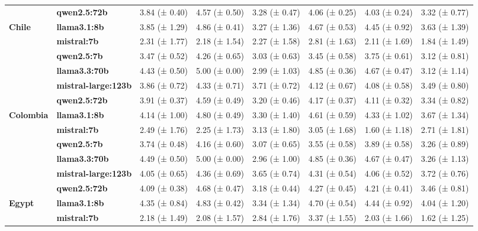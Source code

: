 \begin{longtable}{llllllll}
\textbf{} & \textbf{qwen2.5:72b} & 3.84 (± 0.40) & 4.57 (± 0.50) & 3.28 (± 0.47) & 4.06 (± 0.25) & 4.03 (± 0.24) & 3.32 (± 0.77) \\
\cline{1-8}
\multirow[t]{6}{*}{\textbf{Chile}} & \textbf{llama3.1:8b} & 3.85 (± 1.29) & 4.86 (± 0.41) & 3.27 (± 1.36) & 4.67 (± 0.53) & 4.45 (± 0.92) & 3.63 (± 1.39) \\
\textbf{} & \textbf{mistral:7b} & 2.31 (± 1.77) & 2.18 (± 1.54) & 2.27 (± 1.58) & 2.81 (± 1.63) & 2.11 (± 1.69) & 1.84 (± 1.49) \\
\textbf{} & \textbf{qwen2.5:7b} & 3.47 (± 0.52) & 4.26 (± 0.65) & 3.03 (± 0.63) & 3.45 (± 0.58) & 3.75 (± 0.61) & 3.12 (± 0.81) \\
\textbf{} & \textbf{llama3.3:70b} & 4.43 (± 0.50) & 5.00 (± 0.00) & 2.99 (± 1.03) & 4.85 (± 0.36) & 4.67 (± 0.47) & 3.12 (± 1.14) \\
\textbf{} & \textbf{mistral-large:123b} & 3.86 (± 0.72) & 4.33 (± 0.71) & 3.71 (± 0.72) & 4.12 (± 0.67) & 4.08 (± 0.58) & 3.49 (± 0.80) \\
\textbf{} & \textbf{qwen2.5:72b} & 3.91 (± 0.37) & 4.59 (± 0.49) & 3.20 (± 0.46) & 4.17 (± 0.37) & 4.11 (± 0.32) & 3.34 (± 0.82) \\
\cline{1-8}
\multirow[t]{6}{*}{\textbf{Colombia}} & \textbf{llama3.1:8b} & 4.14 (± 1.00) & 4.80 (± 0.49) & 3.30 (± 1.40) & 4.61 (± 0.59) & 4.33 (± 1.02) & 3.67 (± 1.34) \\
\textbf{} & \textbf{mistral:7b} & 2.49 (± 1.76) & 2.25 (± 1.73) & 3.13 (± 1.80) & 3.05 (± 1.68) & 1.60 (± 1.18) & 2.71 (± 1.81) \\
\textbf{} & \textbf{qwen2.5:7b} & 3.74 (± 0.48) & 4.16 (± 0.60) & 3.07 (± 0.65) & 3.55 (± 0.58) & 3.89 (± 0.58) & 3.26 (± 0.89) \\
\textbf{} & \textbf{llama3.3:70b} & 4.49 (± 0.50) & 5.00 (± 0.00) & 2.96 (± 1.00) & 4.85 (± 0.36) & 4.67 (± 0.47) & 3.26 (± 1.13) \\
\textbf{} & \textbf{mistral-large:123b} & 4.05 (± 0.65) & 4.36 (± 0.69) & 3.65 (± 0.74) & 4.31 (± 0.54) & 4.06 (± 0.52) & 3.72 (± 0.76) \\
\textbf{} & \textbf{qwen2.5:72b} & 4.09 (± 0.38) & 4.68 (± 0.47) & 3.18 (± 0.44) & 4.27 (± 0.45) & 4.21 (± 0.41) & 3.46 (± 0.81) \\
\cline{1-8}
\multirow[t]{6}{*}{\textbf{Egypt}} & \textbf{llama3.1:8b} & 4.35 (± 0.84) & 4.83 (± 0.42) & 3.34 (± 1.34) & 4.70 (± 0.54) & 4.44 (± 0.92) & 4.04 (± 1.20) \\
\textbf{} & \textbf{mistral:7b} & 2.18 (± 1.49) & 2.08 (± 1.57) & 2.84 (± 1.76) & 3.37 (± 1.55) & 2.03 (± 1.66) & 1.62 (± 1.25) \\

\end{longtable}
